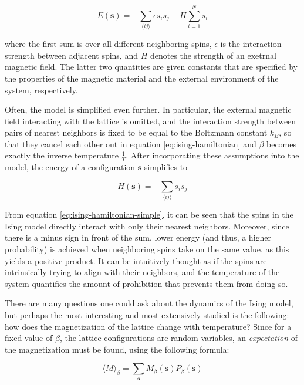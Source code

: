 \documentclass[12pt]{article}
\begin{document}
\begin{equation}
E(\boldsymbol{s}) = - \sum_{\langle ij \rangle} \epsilon s_i s_j - H \sum_{i=1}^N s_i
\label{eq:ising-hamiltonian}
\end{equation}

where the first sum is over all different neighboring spins, $\epsilon$ is the interaction strength between adjacent spins, and $H$ denotes the strength of an exetrnal magnetic field. The latter two quantities are given constants that are specified by the properties of the magnetic material and the external environment of the system, respectively.

Often, the model is simplified even further. In particular, the external magnetic field interacting with the lattice is omitted, and the interaction strength between pairs of nearest neighbors is fixed to be equal to the Boltzmann constant $k_B$, so that they cancel each other out in equation \ref{eq:ising-hamiltonian} and $\beta$ becomes exactly the inverse temperature $\frac{1}{T}$. After incorporating these assumptions into the model, the energy of a configuration $\boldsymbol{s}$ simplifies to 

\begin{equation}
H(\boldsymbol{s}) = - \sum_{\langle ij \rangle} s_i s_j
\label{eq:ising-hamiltonian-simple}
\end{equation}

From equation \ref{eq:ising-hamiltonian-simple}, it can be seen that the spins in the Ising model directly interact with only their nearest neighbors. Moreover, since there is a minus sign in front of the sum, lower energy (and thus, a higher probability) is achieved when neighboring spins take on the same value, as this yields a positive product. It can be intuitively thought as if the spins are intrinsically trying to align with their neighbors, and the temperature of the system quantifies the amount of prohibition that prevents them from doing so. 

There are many questions one could ask about the dynamics of the Ising model, but perhaps the most interesting and most extensively studied is the following: how does the magnetization of the lattice change with temperature? Since for a fixed value of $\beta$, the lattice configurations are random variables, an \textit{expectation} of the magnetization must be found, using the following formula:

\begin{equation}
\langle M \rangle_\beta = \sum_{\boldsymbol{s}} M_\beta(\boldsymbol{s}) P_\beta(\boldsymbol{s})
\label{eq:expected-mag-ising}
\end{equation}
\end{document}

